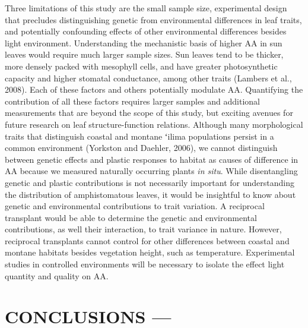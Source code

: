 \documentclass[
  letterpaper,
  DIV=11,
  numbers=noendperiod]{scrartcl}
\begin{document}
Three limitations of this study are the small sample size, experimental
design that precludes distinguishing genetic from environmental
differences in leaf traits, and potentially confounding effects of other
environmental differences besides light environment. Understanding the
mechanistic basis of higher \(\mathrm{AA}\) in sun leaves would require
much larger sample sizes. Sun leaves tend to be thicker, more densely
packed with mesophyll cells, and have greater photosynthetic capacity
and higher stomatal conductance, among other traits (Lambers et al.,
2008). Each of these factors and others potentially modulate
\(\mathrm{AA}\). Quantifying the contribution of all these factors
requires larger samples and additional measurements that are beyond the
scope of this study, but exciting avenues for future research on leaf
structure-function relations. Although many morphological traits that
distinguish coastal and montane ʻilima populations persist in a common
environment (Yorkston and Daehler, 2006), we cannot distinguish between
genetic effects and plastic responses to habitat as causes of difference
in \(\mathrm{AA}\) because we measured naturally occurring plants
\emph{in situ}. While disentangling genetic and plastic contributions is
not necessarily important for understanding the distribution of
amphistomatous leaves, it would be insightful to know about genetic and
environmental contributions to trait variation. A reciprocal transplant
would be able to determine the genetic and environmental contributions,
as well their interaction, to trait variance in nature. However,
reciprocal transplants cannot control for other differences between
coastal and montane habitats besides vegetation height, such as
temperature. Experimental studies in controlled environments will be
necessary to isolate the effect light quantity and quality on
\(\mathrm{AA}\).

\hypertarget{conclusions}{%
\section{CONCLUSIONS ---}\label{conclusions}}
\end{document}
